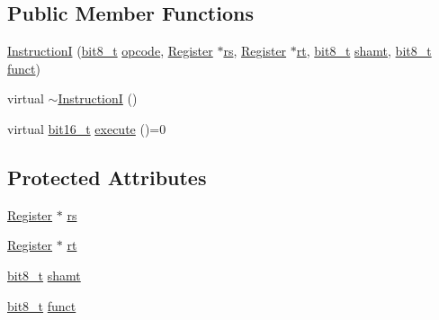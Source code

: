 \subsection*{Public Member Functions}
\begin{DoxyCompactItemize}
\item 
\hyperlink{classMIPS_1_1InstructionI_a57bdbde86da12b395952eea141867ec2}{InstructionI} (\hyperlink{core_8hpp_a6074bae122ae7b527864eec42c728c3c}{bit8\+\_\+t} \hyperlink{classMIPS_1_1Instruction_a45cc6808b5dde8a5d41067d148b55476}{opcode}, \hyperlink{classMIPS_1_1Register}{Register} $\ast$\hyperlink{classMIPS_1_1InstructionI_a2be191d5b3dce505e2e626ec02eb4d62}{rs}, \hyperlink{classMIPS_1_1Register}{Register} $\ast$\hyperlink{classMIPS_1_1InstructionI_add1db07a5c954f35271de8c8a5737487}{rt}, \hyperlink{core_8hpp_a6074bae122ae7b527864eec42c728c3c}{bit8\+\_\+t} \hyperlink{classMIPS_1_1InstructionI_aa9b6da37c374c2ec8d96448d341e5e7d}{shamt}, \hyperlink{core_8hpp_a6074bae122ae7b527864eec42c728c3c}{bit8\+\_\+t} \hyperlink{classMIPS_1_1InstructionI_a5c6efcbbd233a7447c1fe24ea0a1e558}{funct})
\item 
virtual \hyperlink{classMIPS_1_1InstructionI_ae330e8a6a7d5820b0e559a7845867518}{$\sim$\+InstructionI} ()
\item 
virtual \hyperlink{core_8hpp_adc265a970bc35995b5879784bbb3f1b7}{bit16\+\_\+t} \hyperlink{classMIPS_1_1InstructionI_ae60fca5801bf5415cdff06d2aa11764f}{execute} ()=0
\end{DoxyCompactItemize}
\subsection*{Protected Attributes}
\begin{DoxyCompactItemize}
\item 
\hyperlink{classMIPS_1_1Register}{Register} $\ast$ \hyperlink{classMIPS_1_1InstructionI_a2be191d5b3dce505e2e626ec02eb4d62}{rs}
\item 
\hyperlink{classMIPS_1_1Register}{Register} $\ast$ \hyperlink{classMIPS_1_1InstructionI_add1db07a5c954f35271de8c8a5737487}{rt}
\item 
\hyperlink{core_8hpp_a6074bae122ae7b527864eec42c728c3c}{bit8\+\_\+t} \hyperlink{classMIPS_1_1InstructionI_aa9b6da37c374c2ec8d96448d341e5e7d}{shamt}
\item 
\hyperlink{core_8hpp_a6074bae122ae7b527864eec42c728c3c}{bit8\+\_\+t} \hyperlink{classMIPS_1_1InstructionI_a5c6efcbbd233a7447c1fe24ea0a1e558}{funct}
\end{DoxyCompactItemize}


